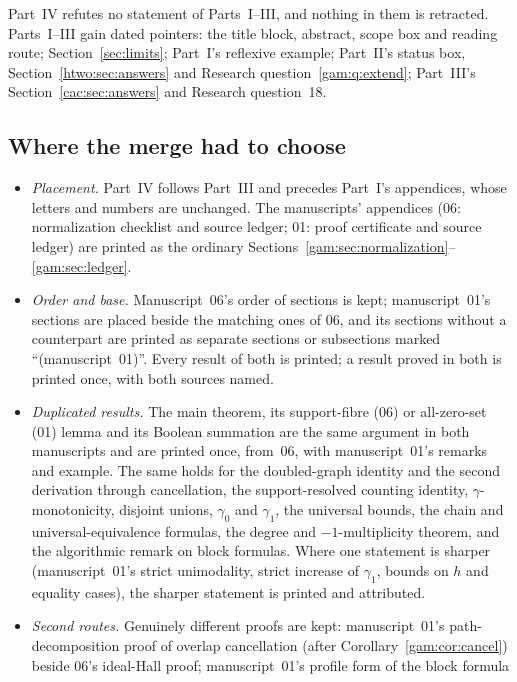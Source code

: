\documentclass[11pt]{article}
\numberwithin{equation}{section}
\theoremstyle{definition}
\begin{document}
Part~IV refutes no statement of Parts~I--III, and nothing in them is
retracted. Parts~I--III gain dated pointers: the title block, abstract,
scope box and reading route; Section~\ref{sec:limits}; Part~I's reflexive
example; Part~II's status box, Section~\ref{htwo:sec:answers} and Research
question~\ref{gam:q:extend}; Part~III's Section~\ref{cac:sec:answers} and
Research question~18.

\subsection{Where the merge had to choose}
\label{gam:sec:merge}
\begin{itemize}[leftmargin=1.4em]
\item \emph{Placement.} Part~IV follows Part~III and precedes Part~I's
appendices, whose letters and numbers are unchanged. The manuscripts'
appendices (06: normalization checklist and source ledger; 01: proof
certificate and source ledger) are printed as the ordinary
Sections~\ref{gam:sec:normalization}--\ref{gam:sec:ledger}.
\item \emph{Order and base.} Manuscript~06's order of sections is kept;
manuscript~01's sections are placed beside the matching ones of 06, and its
sections without a counterpart are printed as separate sections or
subsections marked ``(manuscript~01)''. Every result of both is printed;
a result proved in both is printed once, with both sources named.
\item \emph{Duplicated results.} The main theorem, its support-fibre (06) or
all-zero-set (01) lemma and its Boolean summation are the same argument in
both manuscripts and are printed once, from~06, with manuscript~01's
remarks and example. The same holds for the doubled-graph identity and the
second derivation through cancellation, the support-resolved counting
identity, $\gamma$-monotonicity, disjoint unions, $\gamma_0$ and $\gamma_1$,
the universal bounds, the chain and universal-equivalence formulas, the
degree and $-1$-multiplicity theorem, and the algorithmic remark on block
formulas. Where one statement is sharper (manuscript~01's strict
unimodality, strict increase of $\gamma_1$, bounds on $h$ and equality
cases), the sharper statement is printed and attributed.
\item \emph{Second routes.} Genuinely different proofs are kept: manuscript~01's
path-decomposition proof of overlap cancellation (after
Corollary~\ref{gam:cor:cancel}) beside 06's ideal-Hall proof;
manuscript~01's profile form of the block formula

\end{itemize}
\end{document}
